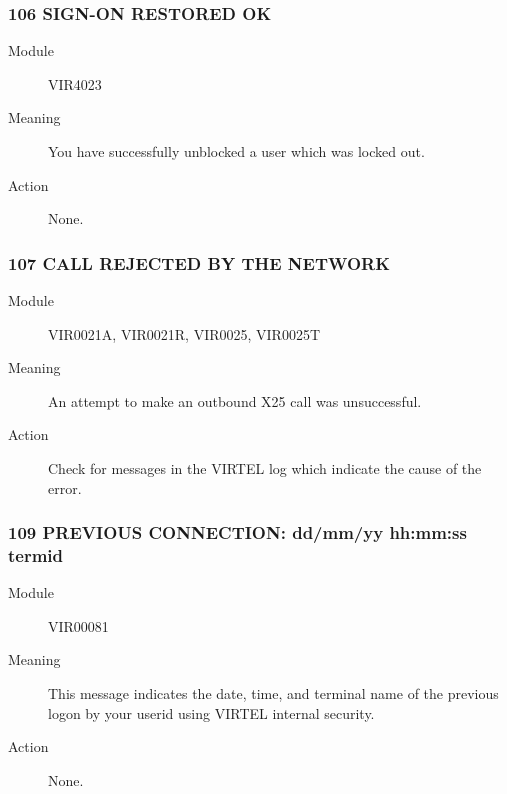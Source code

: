\documentclass[letterpaper,10pt,english]{sphinxmanual}
\begin{document}
\subsubsection{106 SIGN-ON RESTORED OK}
\label{\detokenize{messages:sign-on-restored-ok}}\begin{description}
\item[{Module}] \leavevmode
VIR4023

\item[{Meaning}] \leavevmode
You have successfully unblocked a user which was locked out.

\item[{Action}] \leavevmode
None.

\end{description}


\subsubsection{107 CALL REJECTED BY THE NETWORK}
\label{\detokenize{messages:call-rejected-by-the-network}}\begin{description}
\item[{Module}] \leavevmode
VIR0021A, VIR0021R, VIR0025, VIR0025T

\item[{Meaning}] \leavevmode
An attempt to make an outbound X25 call was unsuccessful.

\item[{Action}] \leavevmode
Check for messages in the VIRTEL log which indicate the cause of the error.

\end{description}


\subsubsection{109 PREVIOUS CONNECTION: dd/mm/yy hh:mm:ss termid}
\label{\detokenize{messages:previous-connection-dd-mm-yy-hh-mm-ss-termid}}\begin{description}
\item[{Module}] \leavevmode
VIR00081

\item[{Meaning}] \leavevmode
This message indicates the date, time, and terminal name of the previous logon by your userid using VIRTEL internal security.

\item[{Action}] \leavevmode
None.

\end{description}
\end{document}
